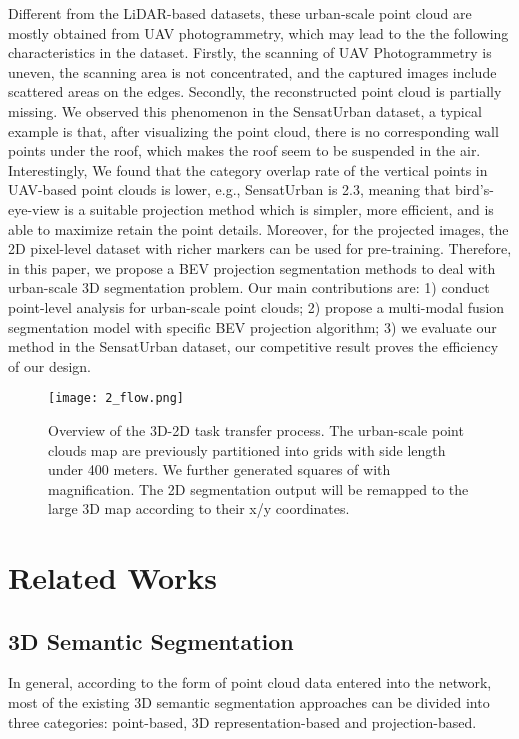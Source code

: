 \documentclass[conference]{IEEEtran}
\begin{document}
Different from the LiDAR-based datasets, these urban-scale point cloud are mostly obtained from UAV photogrammetry, which may lead to the the following characteristics in the dataset. Firstly, the scanning of UAV Photogrammetry is uneven, the scanning area is not concentrated, and the captured images include scattered areas on the edges. Secondly, the reconstructed point cloud is partially missing. We observed this phenomenon in the SensatUrban \cite{Hu2020TowardsSS} dataset, a typical example is that, after visualizing the point cloud, there is no corresponding wall points under the roof, which makes the roof seem to be suspended in the air.
Interestingly, We found that the category overlap rate of the vertical points in UAV-based point clouds is lower, e.g., SensatUrban is 2.3, meaning that bird's-eye-view is a suitable projection method which is simpler, more efficient, and is able to  maximize retain the point details. Moreover, for the projected images, the 2D pixel-level dataset with richer markers can be used for pre-training. Therefore, in this paper, we propose a BEV projection segmentation methods to deal with urban-scale 3D segmentation problem. Our main contributions are: 1) conduct point-level analysis for urban-scale point clouds; 2) propose a multi-modal fusion segmentation model with specific BEV projection algorithm; 3) we evaluate our method in the SensatUrban dataset, our competitive result proves the efficiency of our design.





\begin{figure}[t!]
\centering
\texttt{[image: 2\_flow.png]}
\caption{Overview of the 3D-2D task transfer process. The urban-scale point clouds map are previously partitioned into grids with side length under 400 meters. We further generated squares of  with  magnification. The 2D segmentation output will be remapped to the large 3D map according to their x/y coordinates.}
\label{overview}
\end{figure}




\section{Related Works}
\subsection{3D Semantic Segmentation}
In general, according to the form of point cloud data entered into the network, most of the existing 3D semantic segmentation approaches can be divided into three categories: point-based, 3D representation-based and projection-based. 
\end{document}
